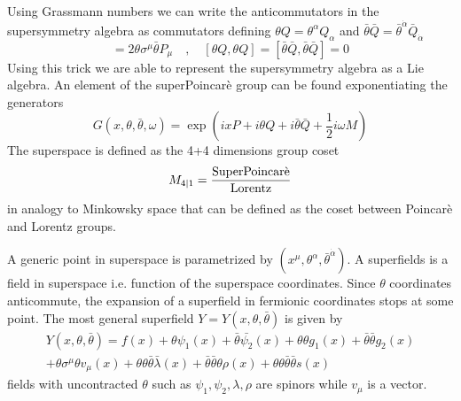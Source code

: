 \begin{appendices}
Using Grassmann numbers we can write the anticommutators in the supersymmetry algebra as commutators defining $\theta Q = \theta^{\alpha} Q_{\alpha}$ and $\bar{\theta} \bar{Q} = \bar{\theta}^{\dot{\alpha}} \bar{Q}_{\dot{\alpha}}$ 
\begin{equation}
[ \theta Q , \bar{\theta} \bar{Q}] = 2 \theta \sigma^{\mu} \bar{\theta} P_{\mu}  \quad , \quad [ \theta Q ,\theta Q ] = [ \bar{\theta} \bar{Q}, \bar{\theta} \bar{Q}] = 0
\end{equation}
Using this trick we are able to represent the supersymmetry algebra as a Lie algebra.
An element of the superPoincarè group can be found exponentiating the generators
\begin{equation}
G( x, \theta, \bar{\theta}, \omega) =  \exp \left( i x P + i \theta Q + i \bar{\theta} \bar{Q} + \frac{1}{2} i \omega M \right)
\end{equation}
The superspace is defined as the 4+4 dimensions group coset
\begin{equation}
  M_{4 | 1 } = \frac{\hbox{SuperPoincarè}}{\hbox{Lorentz}}
 \end{equation} 
in analogy to Minkowsky space that can be defined as the coset between Poincarè and Lorentz groups.

A generic point in superspace is parametrized by $(x^{\mu}, \theta^{\alpha}, \bar{\theta}^{\dot{\alpha}})$.
A superfields is a field in superspace i.e. function of the superspace coordinates.
Since $\theta$ coordinates anticommute, the expansion of a superfield in fermionic coordinates stops at some point.
The most general superfield $Y = Y(x, \theta, \bar{\theta})$ is given by
\begin{multline}
  Y(x, \theta, \bar{\theta}) =  f(x) +
   \theta \psi_1(x) + \bar{\theta} \bar{\psi_2} (x) + \theta \theta g_1(x) + \bar{\theta} \bar{\theta} g_2(x) \\ 
    + \theta \sigma^{\mu} \theta v_{\mu} (x) + \theta \theta\bar{\theta} \bar{\lambda}(x) + \bar{\theta} \bar{\theta} \theta \rho(x) + \theta \theta \bar{\theta} \bar{\theta} s(x) 
\end{multline} 
fields with uncontracted $\theta$ such as $\psi_1,\psi_2, \lambda, \rho$ are spinors while $v_{\mu}$ is a vector.


\end{appendices}
